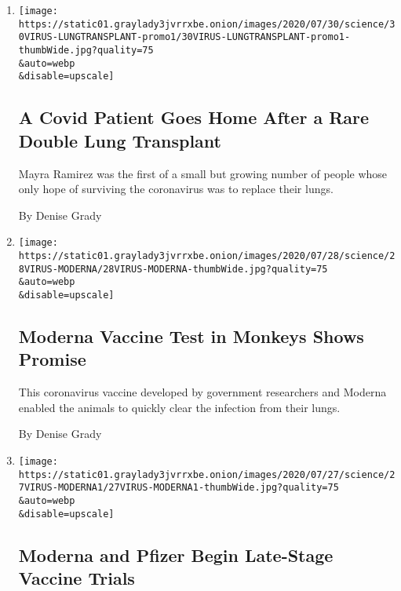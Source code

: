 \begin{enumerate}
\def\labelenumi{\arabic{enumi}.}
\item
  \href{/2020/07/30/health/Covid-lung-transplant.html}{}

  \texttt{[image: https://static01.graylady3jvrrxbe.onion/images/2020/07/30/science/30VIRUS-LUNGTRANSPLANT-promo1/30VIRUS-LUNGTRANSPLANT-promo1-thumbWide.jpg?quality=75\\\&auto=webp\\\&disable=upscale]}

  \hypertarget{a-covid-patient-goes-home-after-a-rare-double-lung-transplant}{%
  \subsection{A Covid Patient Goes Home After a Rare Double Lung
  Transplant}\label{a-covid-patient-goes-home-after-a-rare-double-lung-transplant}}

  Mayra Ramirez was the first of a small but growing number of people
  whose only hope of surviving the coronavirus was to replace their
  lungs.

  By Denise Grady
\item
  \href{/2020/07/28/health/coronavirus-moderna-vaccine-monkeys.html}{}

  \texttt{[image: https://static01.graylady3jvrrxbe.onion/images/2020/07/28/science/28VIRUS-MODERNA/28VIRUS-MODERNA-thumbWide.jpg?quality=75\\\&auto=webp\\\&disable=upscale]}

  \hypertarget{moderna-vaccine-test-in-monkeys-shows-promise}{%
  \subsection{Moderna Vaccine Test in Monkeys Shows
  Promise}\label{moderna-vaccine-test-in-monkeys-shows-promise}}

  This coronavirus vaccine developed by government researchers and
  Moderna enabled the animals to quickly clear the infection from their
  lungs.

  By Denise Grady
\item
  \href{/2020/07/27/health/moderna-vaccine-covid.html}{}

  \texttt{[image: https://static01.graylady3jvrrxbe.onion/images/2020/07/27/science/27VIRUS-MODERNA1/27VIRUS-MODERNA1-thumbWide.jpg?quality=75\\\&auto=webp\\\&disable=upscale]}

  \hypertarget{moderna-and-pfizer-begin-late-stage-vaccine-trials}{%
  \subsection{Moderna and Pfizer Begin Late-Stage Vaccine
  Trials}\label{moderna-and-pfizer-begin-late-stage-vaccine-trials}}


\end{enumerate}
